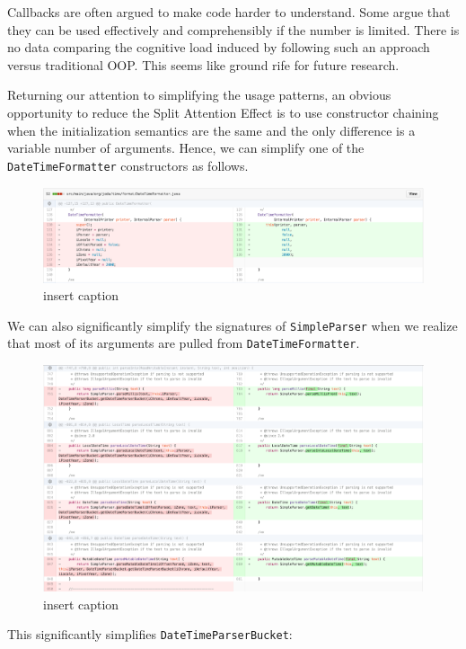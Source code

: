 Callbacks are often argued to make code harder to understand. Some argue that they can be used effectively and comprehensibly if the number is limited. There is no data comparing the cognitive load induced by following such an approach versus traditional OOP. This seems like ground rife for future research.

Returning our attention to simplifying the usage patterns, an obvious opportunity to reduce the Split Attention Effect is to use constructor chaining when the initialization semantics are the same and the only difference is a variable number of arguments. Hence, we can simplify one of the \texttt{DateTimeFormatter} constructors as follows.

\begin{figure}[H]
	\centering
	\includegraphics[width=\linewidth]{code95}
	\caption{insert caption}
\end{figure}

We can also significantly simplify the signatures of \texttt{SimpleParser} when we realize that most of its arguments are pulled from \texttt{DateTimeFormatter}.

\begin{figure}[H]
	\centering
	\includegraphics[width=\linewidth]{code96}
	\caption{insert caption}
\end{figure}

This significantly simplifies \texttt{DateTimeParserBucket}:
 
